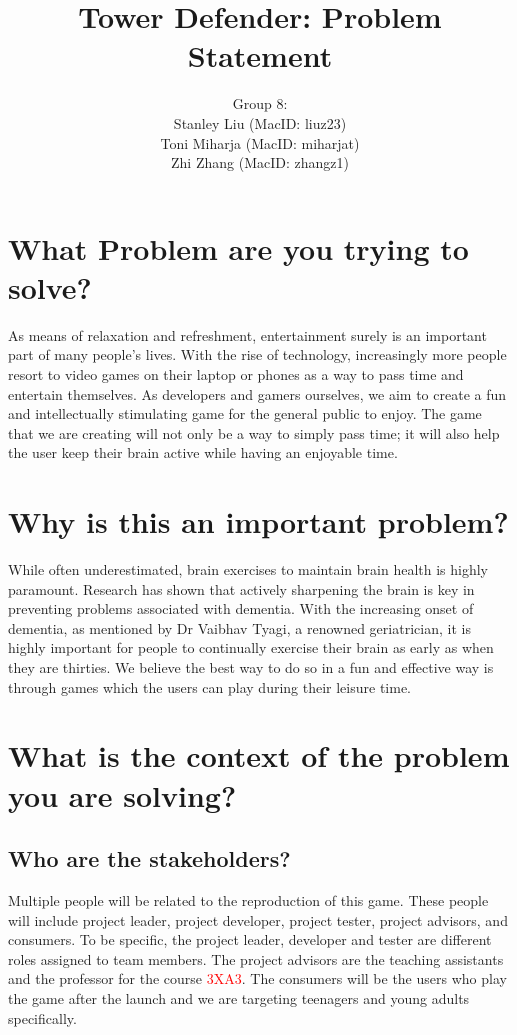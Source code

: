 \documentclass[12pt]{article}
\title{Tower Defender: Problem Statement}
\author{Group 8: \\
                 Stanley Liu (MacID: liuz23) \\    
                 Toni Miharja (MacID: miharjat)\\
                 Zhi Zhang (MacID: zhangz1)}
\begin{document}
\maketitle

\section {What Problem are you trying to solve?}
As means of relaxation and refreshment, entertainment surely is an important part of many people’s lives. With the rise of technology, increasingly more people resort to video games on their laptop or phones as a way to pass time and entertain themselves. As developers and gamers ourselves, we aim to create a fun and intellectually stimulating game for the general public to enjoy. The game that we are creating will not only be a way to simply pass time; it will also help the user keep their brain active while having an enjoyable time. 

\section {Why is this an important problem?}
While often underestimated, brain exercises to maintain brain health is highly paramount. Research has shown that actively sharpening the brain is key in preventing problems associated with dementia. With the increasing onset of dementia, as mentioned by Dr Vaibhav Tyagi, a renowned geriatrician, it is highly important for people to continually exercise their brain as early as when they are thirties. We believe the best way to do so in a fun and effective way is through games which the users can play during their leisure time.

\section {What is the context of the problem you are solving?}
    \subsection {Who are the stakeholders?}
    Multiple people will be related to the reproduction of this game. These people will include project leader, project developer, project tester, project advisors, and consumers. To be specific, the project leader, developer and tester are different roles assigned to team members. The project advisors are the teaching assistants and the professor for the course \textcolor{red}{3XA3}. The consumers will be the users who play the game after the launch and we are targeting teenagers and young adults specifically. 
\end{document}
